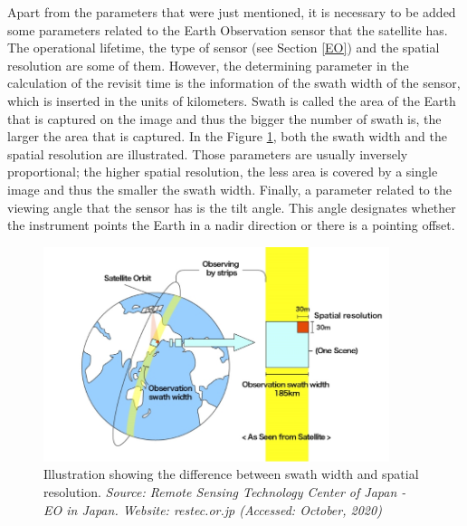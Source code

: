 
Apart from the parameters that were just mentioned, it is necessary to be added some parameters related to the Earth Observation sensor that the satellite has. The operational lifetime, the type of sensor (see Section \ref{EO}) and the spatial resolution are some of them. However, the determining parameter in the calculation of the revisit time is the information of the swath width of the sensor, which is inserted in the units of kilometers. Swath is called the area of the Earth that is captured on the image and thus the bigger the number of swath is, the larger the area that is captured. In the Figure \ref{swath_width}, both the swath width and the spatial resolution are illustrated. Those parameters are usually inversely proportional; the higher spatial resolution, the less area is covered by a single image and thus the smaller the swath width. Finally, a parameter related to the viewing angle that the sensor has is the tilt angle. This angle designates whether the instrument points the Earth in a nadir direction or there is a pointing offset. 

\begin{figure}
\centering
\includegraphics[width=0.9\textwidth]{Images/swath_width.png}\caption{Illustration showing the difference between swath width and spatial resolution. \textit{Source: Remote Sensing Technology Center of Japan - EO in Japan. Website: restec.or.jp (Accessed: October, 2020)}} %
\label{swath_width} 
\end{figure}


